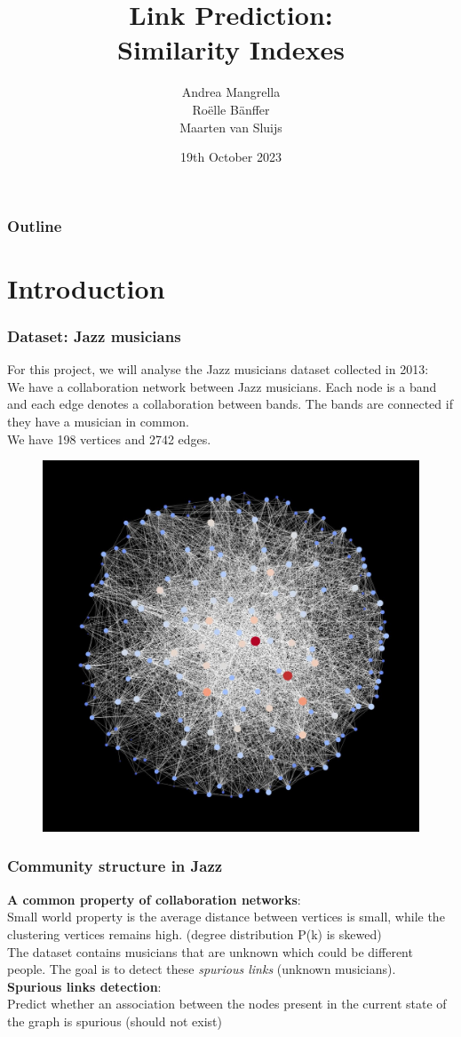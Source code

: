 \documentclass{beamer}
\title[Network\_science]{
  Link Prediction:\\ 
  Similarity Indexes}
\author[Andrea Mangrella]{
  Andrea Mangrella\\
  Roëlle Bänffer\\
  Maarten van Sluijs\\
  }
\institute[Eindhoven University of Technology]{
  Department of Mathematics and Computer Science \\
  Eindhoven University of Technology}
\date[slides Example 2012]{
    19th October 2023   
  }
\begin{document}
\begin{frame}
  \titlepage
\end{frame}

\begin{frame}
  \frametitle{Outline}
  \tableofcontents
\end{frame}

\section{Introduction}
\begin{frame}
  \frametitle{Dataset: Jazz musicians}
  For this project, we will analyse the Jazz musicians dataset collected in 2013:\\
  We have a collaboration network between Jazz musicians. Each node is a band and each edge denotes a collaboration between bands. The bands are connected if they have a musician in common. \\
  We have 198 vertices and 2742 edges.
 
\begin{figure}
\centering
\includegraphics[width=.4\linewidth]{jazz_net.jpeg}
  \label{fig:jazz_net}
\end{figure}
 
\end{frame}

\begin{frame}
  \frametitle{Community structure in Jazz}
  \textbf{A common property of collaboration networks}:\\ Small world property is the average distance between vertices is small, while the clustering vertices remains high. (degree distribution P(k) is skewed)\\

  The dataset contains musicians that are unknown which could be different people. The goal is to detect these \textit{spurious links} (unknown musicians).\\
  

  \textbf{Spurious links detection}: \\
  Predict whether an association between the nodes present in the current state of the graph is spurious (should not exist)
  

  
\end{frame}
\end{document}
